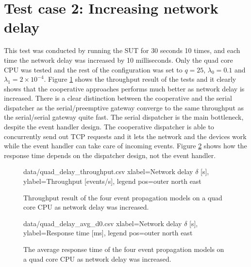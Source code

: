\section{Test case 2: Increasing network delay}

This test was conducted by running the SUT for 30 seconds 10 times, and each
time the network delay was increased by 10 milliseconds. Only the quad core CPU
was tested and the rest of the configuration was set to $q = 25$, $\lambda_0 =
0.1$ and $\lambda_1 = 2 \times 10^{-4}$. Figure \ref{fig:quad_delay_throughput}
shows the throughput result of the tests and it clearly shows that the
cooperative approaches performs much better as network delay is increased.
There is a clear distinction between the cooperative and the serial dispatcher
as the serial/preemptive gateway converge to the same throughput as the
serial/serial gateway quite fast. The serial dispatcher is the main bottleneck,
despite the event handler design. The cooperative dispatcher is able to
concurrently send out TCP requests and it lets the network and the devices work
while the event handler can take care of incoming events. Figure
\ref{fig:quad_delay_avg_d0} shows how the response time depends on the
dispatcher design, not the event handler.

\begin{figure}[h!]
    \centering
    \performanceplot
    {data/quad_delay_throughput.csv}
    {
        xlabel={Network delay $\delta$ [s]},
        ylabel={Throughput [events/s]},
        legend pos=outer north east
    }

    \caption[Throughput result when network delay was increased.]{Throughput
    result of the four event propagation models on a quad core CPU as network
    delay was increased.}

    \label{fig:quad_delay_throughput}
\end{figure}

\begin{figure}[h!]
    \centering
    \performanceplot
    {data/quad_delay_avg_d0.csv}
    {
        xlabel={Network delay $\delta$ [s]},
        ylabel={Response time [ms]},
        legend pos=outer north east
    }

    \caption[Response time when network delay was increased.]{The average
    response time of the four event propagation models on a quad core CPU as
    network delay was increased.}

    \label{fig:quad_delay_avg_d0}
\end{figure}

